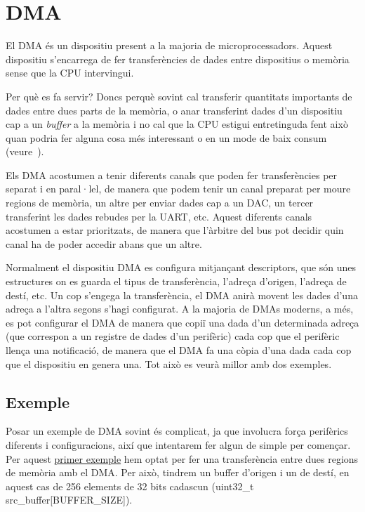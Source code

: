 \chapter{DMA}
\label{sub:DMA}
El \gls{DMA} és un dispositiu present a la majoria de microprocessadors. Aquest dispositiu s'encarrega de fer transferències de dades entre dispositius o memòria sense que la CPU intervingui.

Per què es fa servir? Doncs perquè sovint cal transferir quantitats importants de dades entre dues parts de la memòria, o anar transferint dades d'un dispositiu cap a un {\em buffer} a la memòria i no cal que la CPU estigui entretinguda fent això quan podria fer alguna cosa més interessant o en un mode de baix consum (veure~).

Els DMA acostumen a tenir diferents canals que poden fer transferències per separat i en paral·lel, de manera que podem tenir un canal preparat per moure regions de memòria, un altre per enviar dades cap a un DAC, un tercer transferint les dades rebudes per la UART, etc. Aquest diferents canals acostumen a estar prioritzats, de manera que l'àrbitre del bus pot decidir quin canal ha de poder accedir abans que un altre.

Normalment el dispositiu DMA es configura mitjançant descriptors, que són unes estructures on es guarda el tipus de transferència, l'adreça d'origen, l'adreça de destí, etc. Un cop s'engega la transferència, el DMA anirà movent les dades d'una adreça a l'altra segons s'hagi configurat. A la majoria de DMAs moderns, a més, es pot configurar el DMA de manera que copiï una dada d'un determinada adreça (que correspon a un registre de dades d'un perifèric) cada cop que el perifèric llença una notificació, de manera que el DMA fa una còpia d'una dada cada cop que el dispositiu en genera una. Tot això es veurà millor amb dos exemples.

\section{Exemple}
\label{sub:DMA_example}
Posar un exemple de \gls{DMA} sovint és complicat, ja que involucra força perifèrics diferents i configuracions, així que intentarem fer algun de simple per començar. Per aquest \href{https://github.com/mariusmm/cursembedded/tree/master/Simplicity/DMA_1}{primer exemple} hem optat per fer una transferència entre dues regions de memòria amb el DMA. Per això, tindrem un buffer d'origen i un de destí, en aquest cas de 256 elements de 32 bits cadascun (uint32\_t src\_buffer[BUFFER\_SIZE]).

